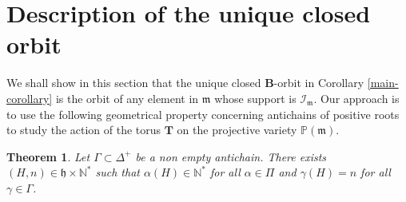 \documentclass{amsart}
\newtheorem{theorem}{Theorem}[section]
\theoremstyle{definition}
\theoremstyle{remark}
\numberwithin{equation}{section}
\newcommand{\soc}[1]{\mathcal{I}_{#1}}
\newcommand{\group}[1]{\mathbf{#1}}
\begin{document}
\section{Description of the unique closed orbit}\label{sec:description}

We shall show in this section that the unique closed $\group{B}$-orbit in Corollary \ref{main-corollary}
is the orbit of any element in $\mathfrak{m}$
whose support is $\soc{\mathfrak{m}}$. Our approach is to use the
following geometrical property concerning antichains of positive roots to study 
the action of the torus $\group{T}$ on the projective variety $\mathbb{P}(\mathfrak{m})$.

\begin{theorem}\label{antichain-hyperplane}
Let $\Gamma \subset \Delta^{+}$ be a non empty antichain. 
There exists $(H,n) \in \mathfrak{h}\times \mathbb{N}^{*}$ such that 
$\alpha (H) \in \mathbb{N}^{*}$ for all $\alpha \in \Pi$ and 
$\gamma  (H) = n$ 
for all $\gamma \in \Gamma$.
\end{theorem}
\end{document}
